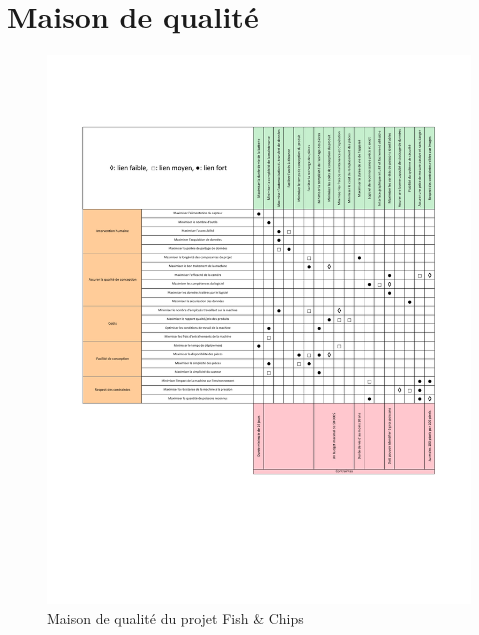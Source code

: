 \newpage


\section{Maison de qualité}

\begin{figure}[htb!]
    \centering
    \includegraphics[width=0.90\linewidth]{fig/maison_de_qualite.pdf}
    \caption{Maison de qualité du projet Fish \& Chips}
    \label{fig:maison_qualite}
\end{figure}
